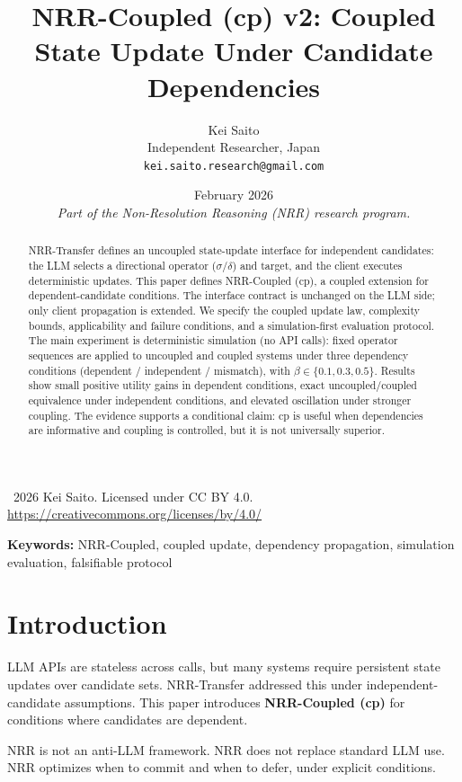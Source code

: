 \documentclass[11pt,a4paper]{article}
\title{\textbf{NRR-Coupled (cp) v2: Coupled State Update Under Candidate Dependencies}}
\author{Kei Saito\\Independent Researcher, Japan\\\texttt{kei.saito.research@gmail.com}}
\date{February 2026\\[0.5em]\textit{Part of the Non-Resolution Reasoning (NRR) research program.}}
\begin{document}
\maketitle

\begin{center}
\textcopyright\ 2026 Kei Saito. Licensed under CC BY 4.0.\\
\url{https://creativecommons.org/licenses/by/4.0/}
\end{center}

\begin{abstract}
NRR-Transfer defines an uncoupled state-update interface for independent candidates: the LLM selects a directional operator (\(\sigma\)/\(\delta\)) and target, and the client executes deterministic updates. This paper defines NRR-Coupled (cp), a coupled extension for dependent-candidate conditions. The interface contract is unchanged on the LLM side; only client propagation is extended. We specify the coupled update law, complexity bounds, applicability and failure conditions, and a simulation-first evaluation protocol. The main experiment is deterministic simulation (no API calls): fixed operator sequences are applied to uncoupled and coupled systems under three dependency conditions (dependent / independent / mismatch), with \(\beta\in\{0.1,0.3,0.5\}\). Results show small positive utility gains in dependent conditions, exact uncoupled/coupled equivalence under independent conditions, and elevated oscillation under stronger coupling. The evidence supports a conditional claim: cp is useful when dependencies are informative and coupling is controlled, but it is not universally superior.
\end{abstract}

\noindent\textbf{Keywords:} NRR-Coupled, coupled update, dependency propagation, simulation evaluation, falsifiable protocol

\section{Introduction}
LLM APIs are stateless across calls, but many systems require persistent state updates over candidate sets. NRR-Transfer addressed this under independent-candidate assumptions. This paper introduces \textbf{NRR-Coupled (cp)} for conditions where candidates are dependent.

NRR is not an anti-LLM framework.
NRR does not replace standard LLM use.
NRR optimizes when to commit and when to defer, under explicit conditions.
\end{document}
